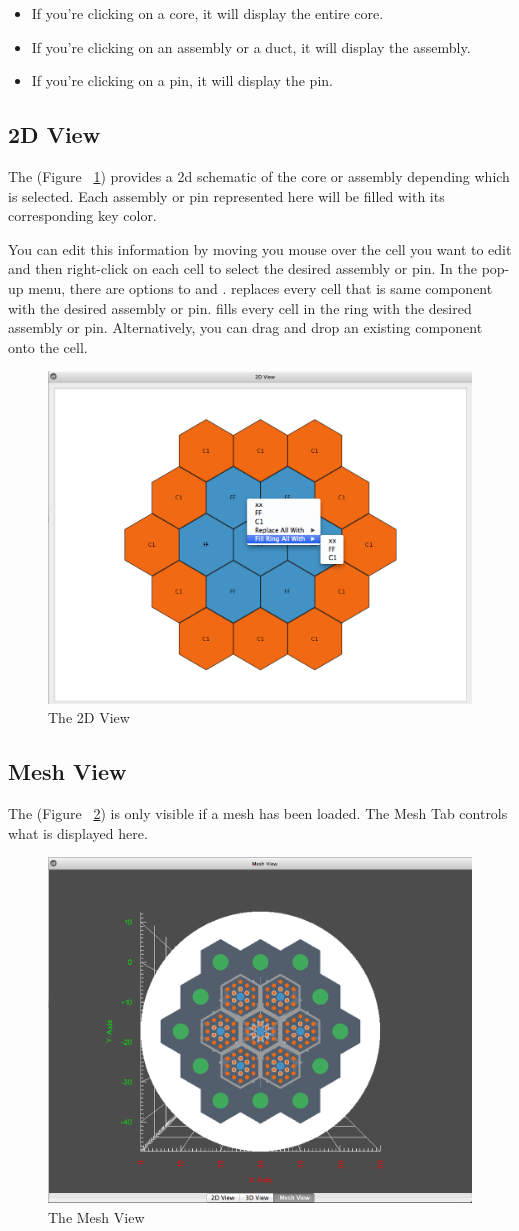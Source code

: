 \begin{itemize}
	\item{If you're clicking on a core, it will display the entire core.}
	\item{If you're clicking on an assembly or a duct, it will display the assembly.}
	\item{If you're clicking on a pin, it will display the pin.}
\end{itemize}

\subsection{2D View}
The  (Figure ~\ref{fig:2DView}) provides a 2d schematic of the core or assembly depending which is selected. Each assembly or pin represented here will be filled with its corresponding key color.

You can edit this information by moving you mouse over the cell you want to edit and then right-click on each cell to select the desired assembly or pin.  In the pop-up menu, there are options to  and .  replaces every cell that is same component with the desired assembly or pin.   fills every cell in the ring with the desired assembly or pin.  Alternatively, you can drag and drop an existing component onto the cell.

\begin{figure}[h]
	\begin{center}
		\includegraphics[width=0.5\linewidth]{Images/2DView.png}
		\caption{The 2D View}
		\label{fig:2DView}
	\end{center}
\end{figure}

\subsection{Mesh View}
The  (Figure ~\ref{fig:MeshView}) is only visible if a mesh has been loaded.  The Mesh Tab controls what is displayed here.

\begin{figure}[h]
	\begin{center}
		\includegraphics[width=0.5\linewidth]{Images/MeshView.png}
		\caption{The Mesh View}
		\label{fig:MeshView}
	\end{center}
\end{figure}

